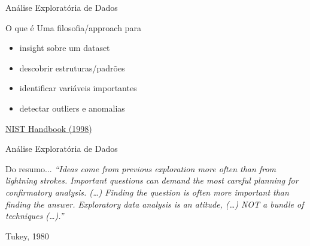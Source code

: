 \documentclass{beamer}
\begin{document}
\begin{frame}{Análise Exploratória de Dados}
  \begin{block}{O que é}
    \scriptsize
    Uma filosofia/approach para

    \bigskip
    \begin{itemize}
      \footnotesize
    \item insight sobre um dataset
      \medskip
    \item descobrir estruturas/padrões
      \medskip
    \item identificar variáveis importantes
      \medskip
    \item detectar outliers e anomalias
    \end{itemize}
  \end{block}

  \vfill
  \scriptsize
  \hfill \href{https://www.itl.nist.gov/div898/handbook/eda/section1/eda16.htm}
  {NIST Handbook (1998)}
\end{frame}

\begin{frame}{Análise Exploratória de Dados}
  \begin{block}{Do resumo...}
    \footnotesize {\em ``Ideas come from previous exploration more
      often than from lightning strokes. Important questions can
      demand the most careful planning for confirmatory
      analysis. (\ldots) \alert<2>{Finding the question is often more
        important than finding the answer.} Exploratory data analysis
      is an atitude, (\ldots) NOT a bundle of techniques (\ldots).''}
  \end{block}

  \vfill
  \scriptsize
  \hfill Tukey, 1980
\end{frame}

\end{document}
